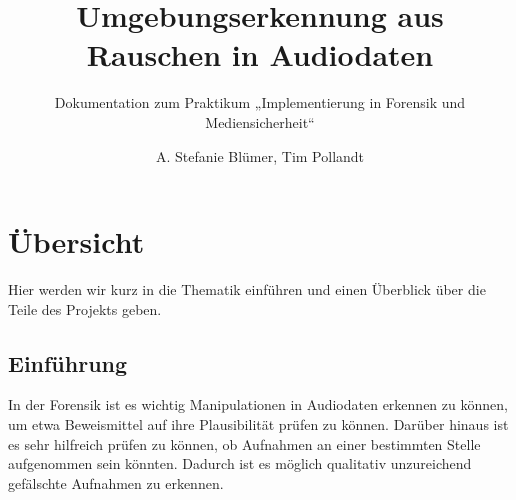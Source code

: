 \documentclass[
	fontsize=10.5pt,
	marginpar=false,
	ngerman,
	accentcolor=3d
	]{tudapub}
\begin{document}

\title{Umgebungserkennung aus Rauschen in Audiodaten}
\subtitle{Dokumentation zum Praktikum „Implementierung in Forensik und Mediensicherheit“}
\author{A. Stefanie Blümer, Tim Pollandt}

\titleimage{
	\color{TUDa-3d}\rule{\width}{\height}
}





\maketitle

%


\tableofcontents

\pagebreak
{}
\section{Übersicht}
Hier werden wir kurz in die Thematik einführen und einen Überblick über die Teile des Projekts geben.

\subsection{Einführung}
In der Forensik ist es wichtig Manipulationen in Audiodaten erkennen zu können, um etwa Beweismittel auf ihre Plausibilität prüfen zu können. Darüber hinaus ist es sehr hilfreich prüfen zu können, ob Aufnahmen an einer bestimmten Stelle aufgenommen sein könnten. Dadurch ist es möglich qualitativ unzureichend gefälschte Aufnahmen zu erkennen.
\end{document}
